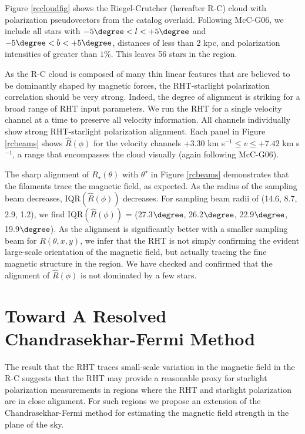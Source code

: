 Figure \ref{rccloudfig} shows the Riegel-Crutcher (hereafter R-C) cloud with polarization pseudovectors from the \cite{Heiles:2000un} catalog overlaid. Following McC-G06, we include all stars with ${-5 \degree < l < +5 \degree}$ and ${-5 \degree < b < +5 \degree}$, distances of less than 2 kpc, and polarization intensities of greater than ${1\%}$. This leaves 56 stars in the region. 

As the R-C cloud is composed of many thin linear features that are believed to be dominantly shaped by magnetic forces, the RHT-starlight polarization correlation should be very strong. Indeed, the degree of alignment is striking for a broad range of RHT input parameters. We run the RHT for a single velocity channel at a time to preserve all velocity information. All channels individually show strong RHT-starlight polarization alignment. Each panel in Figure \ref{rcbeams} shows ${\hat{R}\left(\phi\right)}$ for the velocity channels +3.30 km s${^{-1} \le v \le +7.42}$ km s${^{-1}}$, a range that encompasses the cloud visually (again following McC-G06).

The sharp alignment of ${R}_\star\left(\theta\right)$ with $\theta^\star$ in Figure \ref{rcbeams} demonstrates that the filaments trace the magnetic field, as expected. As the radius of the sampling beam decreases, IQR$(\hat{R}\left(\phi\right))$ decreases. For sampling beam radii of (14.6\arcmin, 8.7\arcmin, 2.9\arcmin, 1.2\arcmin), we find IQR$(\hat{R}\left(\phi\right))$ = (27.3$\degree$, 26.2$\degree$, 22.9$\degree$, 19.9$\degree$). As the alignment is significantly better with a smaller sampling beam for $R\left(\theta, x, y\right)$, we infer that the RHT is not simply confirming the evident large-scale orientation of the magnetic field, but actually tracing the fine magnetic structure in the region. We have checked and confirmed that the alignment of $\hat{R}\left(\phi\right)$ is not dominated by a few stars. \\

\section{Toward A Resolved Chandrasekhar-Fermi Method}\label{cfmethod}
The result that the RHT traces small-scale variation in the magnetic field in the R-C suggests that the RHT may provide a reasonable proxy for starlight polarization measurements in regions where the RHT and starlight polarization are in close alignment. For such regions we propose an extension of the Chandrasekhar-Fermi method for estimating the magnetic field strength in the plane of the sky.

